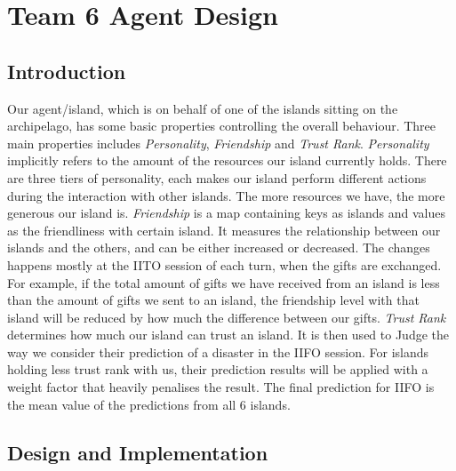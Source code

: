\chapter{Team 6 Agent Design}
\section{Introduction} \label{sec:Team6_Intro}
Our agent/island, which is on behalf of one of the islands sitting on the archipelago, has some basic properties controlling the overall behaviour. Three main properties includes \emph{Personality}, \emph{Friendship} and \emph{Trust Rank}. \emph{Personality} implicitly refers to the amount of the resources our island currently holds. There are three tiers of personality, each makes our island perform different actions during the interaction with other islands. The more resources we have, the more generous our island is. \emph{Friendship} is a map containing keys as islands and values as the friendliness with certain island. It measures the relationship between our islands and the others, and can be either increased or decreased. The changes happens mostly at the IITO session of each turn, when the gifts are exchanged. For example, if the total amount of gifts we have received from an island is less than the amount of gifts we sent to an island, the friendship level with that island will be reduced by how much the difference between our gifts. \emph{Trust Rank} determines how much our island can trust an island. It is then used to Judge the way we consider their prediction of a disaster in the IIFO session. For islands holding less trust rank with us, their prediction results will be applied with a weight factor that heavily penalises the result. The final prediction for IIFO is the mean value of the predictions from all 6 islands.

\section{Design and Implementation} \label{sec:Team6_design_impl}

